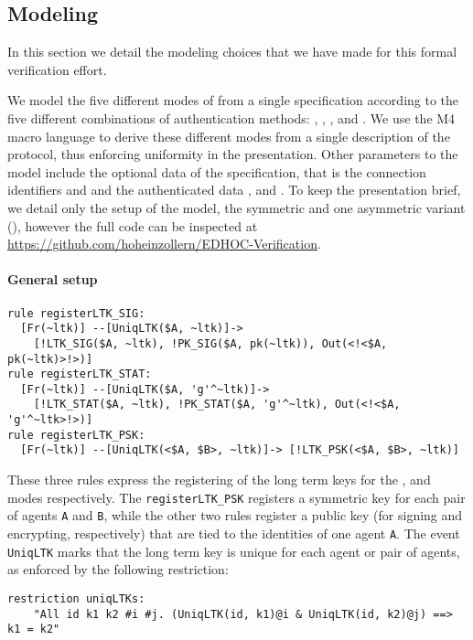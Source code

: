 \subsection{Modeling \mEdhoc{}}
In this section we detail the modeling choices that we have made for this formal
verification effort.
%

We model the five different modes of \mEdhoc{} from a single specification
according to the five different combinations of authentication methods:
\mPskPsk, \mSigSig, \mSigStat, \mStatSig and \mStatStat.
%
We use the M4 macro language to derive these different modes from a single
description of the protocol, thus enforcing uniformity in the presentation.
%
Other parameters to the model include the optional data of the \mEdhoc{}
specification, that is the connection identifiers \mCi{} and \mCr{} and
the authenticated data \mADone, \mADtwo{} and \mADthree.
%
To keep the presentation brief, we detail only the setup of the model,
the symmetric and one asymmetric variant (\mSigStat), however the full
code can be inspected at
\url{https://github.com/hoheinzollern/EDHOC-Verification}.



\paragraph{General setup}
\begin{lstlisting}
rule registerLTK_SIG:
  [Fr(~ltk)] --[UniqLTK($A, ~ltk)]->
    [!LTK_SIG($A, ~ltk), !PK_SIG($A, pk(~ltk)), Out(<!<$A, pk(~ltk)>!>)]
rule registerLTK_STAT:
  [Fr(~ltk)] --[UniqLTK($A, 'g'^~ltk)]->
    [!LTK_STAT($A, ~ltk), !PK_STAT($A, 'g'^~ltk), Out(<!<$A, 'g'^~ltk>!>)]
rule registerLTK_PSK:
  [Fr(~ltk)] --[UniqLTK(<$A, $B>, ~ltk)]-> [!LTK_PSK(<$A, $B>, ~ltk)]
\end{lstlisting}
    
These three rules express the registering of the long term keys for the \mSig,
\mStat{} and \mPsk{} modes respectively.
%
The \lstinline{registerLTK_PSK} registers a symmetric key for each pair of
agents \lstinline{A} and \lstinline{B}, while the other two rules register a
public key (for signing and encrypting, respectively) that are tied to the
identities of one agent \lstinline{A}.
%
The event \lstinline{UniqLTK} marks that the long term key is unique for each
agent or pair of agents, as enforced by the following restriction:
\begin{lstlisting}
restriction uniqLTKs:
    "All id k1 k2 #i #j. (UniqLTK(id, k1)@i & UniqLTK(id, k2)@j) ==> k1 = k2"
\end{lstlisting}

